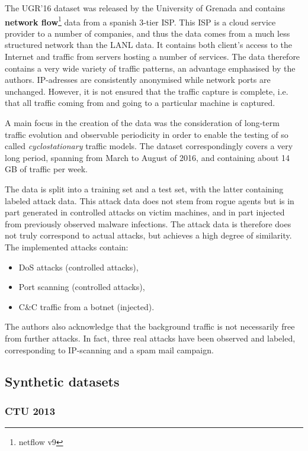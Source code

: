 The UGR'16 dataset was released by the University of Grenada and contains \textbf{network flow}\footnote{netflow v9} data from a spanish 3-tier ISP. This ISP is a cloud service provider to a number of companies, and thus the data comes from a much less structured network than the LANL data. It contains both client's access to the Internet and traffic from servers hosting a number of services. The data therefore contains a very wide variety of traffic patterns, an advantage emphasised by the authors. IP-adresses are consistently anonymised while network ports are unchanged. However, it is not ensured that the traffic capture is complete, i.e. that all traffic coming from and going to a particular machine is captured.

A main focus in the creation of the data was the consideration of long-term traffic evolution and observable periodicity in order to enable the testing of so called \textit{cyclostationary} traffic models. The dataset correspondingly covers a very long period, spanning from March to August of 2016, and containing about 14 GB of traffic per week. 

The data is split into a training set and a test set, with the latter containing labeled attack data. This attack data does not stem from rogue agents but is in part generated in controlled attacks on victim machines, and in part injected from previously observed malware infections. The attack data is therefore does not truly correspond to actual attacks, but achieves a high degree of similarity. The implemented attacks contain:
\begin{itemize}
\item DoS attacks (controlled attacks),
\item Port scanning (controlled attacks),
\item C\&C traffic from a botnet (injected).
\end{itemize}

The authors also acknowledge that the background traffic is not necessarily free from further attacks. In fact, three real attacks have been observed and labeled, corresponding to IP-scanning and a spam mail campaign.

\subsection{Synthetic datasets}

\subsubsection*{CTU 2013 \cite{noauthor_ctu-13_nodate, garcia2014empirical}}

